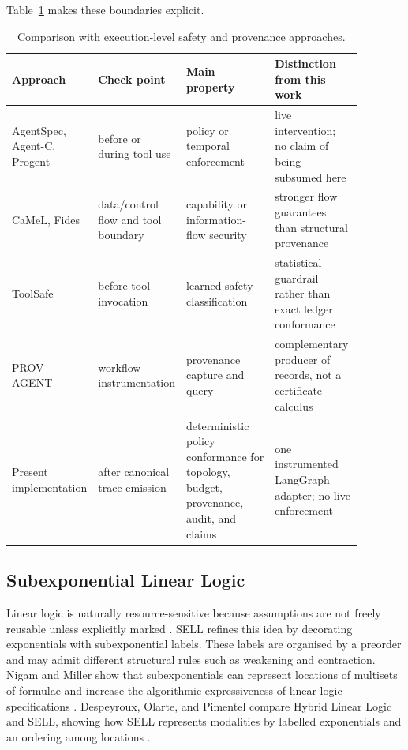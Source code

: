 \documentclass[a4paper,fleqn]{cas-sc}
\begin{document}
Table~\ref{tab:agent-safety-comparison} makes these boundaries explicit.

\begin{table}[tbp]
\centering
\scriptsize
\begin{tabular}{>{\raggedright\arraybackslash}p{0.17\linewidth}>{\raggedright\arraybackslash}p{0.20\linewidth}>{\raggedright\arraybackslash}p{0.26\linewidth}>{\raggedright\arraybackslash}p{0.25\linewidth}}
\toprule
Approach & Check point & Main property & Distinction from this work \\
\midrule
AgentSpec, Agent-C, Progent & before or during tool use & policy or temporal enforcement & live intervention; no claim of being subsumed here \\
CaMeL, Fides & data/control flow and tool boundary & capability or information-flow security & stronger flow guarantees than structural provenance \\
ToolSafe & before tool invocation & learned safety classification & statistical guardrail rather than exact ledger conformance \\
PROV-AGENT & workflow instrumentation & provenance capture and query & complementary producer of records, not a certificate calculus \\
Present implementation & after canonical trace emission & deterministic policy conformance for topology, budget, provenance, audit, and claims & one instrumented LangGraph adapter; no live enforcement \\
\bottomrule
\end{tabular}
\caption{Comparison with execution-level safety and provenance approaches.}
\label{tab:agent-safety-comparison}
\end{table}

\subsection{Subexponential Linear Logic}

Linear logic is naturally resource-sensitive because assumptions are not freely reusable unless explicitly marked \cite{girard1987}. SELL refines this idea by decorating exponentials with subexponential labels. These labels are organised by a preorder and may admit different structural rules such as weakening and contraction. Nigam and Miller show that subexponentials can represent locations of multisets of formulae and increase the algorithmic expressiveness of linear logic specifications \cite{nigam2009}. Despeyroux, Olarte, and Pimentel compare Hybrid Linear Logic and SELL, showing how SELL represents modalities by labelled exponentials and an ordering among locations \cite{despeyroux2017}.
\end{document}
